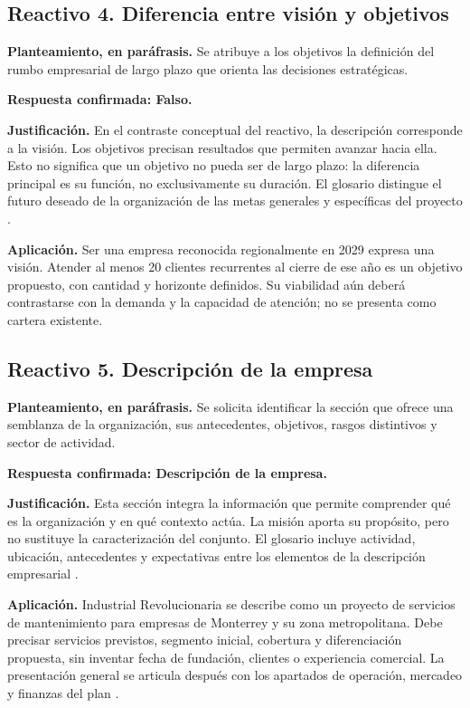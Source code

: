 {\subsection{Reactivo 4. Diferencia entre visión y objetivos}

\textbf{Planteamiento, en paráfrasis.} Se atribuye a los objetivos la definición del rumbo empresarial de largo plazo que orienta las decisiones estratégicas.

\textbf{Respuesta confirmada: Falso.}

\textbf{Justificación.} En el contraste conceptual del reactivo, la descripción corresponde a la visión. Los objetivos precisan resultados que permiten avanzar hacia ella. Esto no significa que un objetivo no pueda ser de largo plazo: la diferencia principal es su función, no exclusivamente su duración. El glosario distingue el futuro deseado de la organización de las metas generales y específicas del proyecto \citep{planNegociosGlosario2024}.

\textbf{Aplicación.} Ser una empresa reconocida regionalmente en 2029 expresa una visión. Atender al menos 20 clientes recurrentes al cierre de ese año es un objetivo propuesto, con cantidad y horizonte definidos. Su viabilidad aún deberá contrastarse con la demanda y la capacidad de atención; no se presenta como cartera existente.

\subsection{Reactivo 5. Descripción de la empresa}

\textbf{Planteamiento, en paráfrasis.} Se solicita identificar la sección que ofrece una semblanza de la organización, sus antecedentes, objetivos, rasgos distintivos y sector de actividad.

\textbf{Respuesta confirmada: Descripción de la empresa.}

\textbf{Justificación.} Esta sección integra la información que permite comprender qué es la organización y en qué contexto actúa. La misión aporta su propósito, pero no sustituye la caracterización del conjunto. El glosario incluye actividad, ubicación, antecedentes y expectativas entre los elementos de la descripción empresarial \citep{planNegociosGlosario2024}.

\textbf{Aplicación.} Industrial Revolucionaria se describe como un proyecto de servicios de mantenimiento para empresas de Monterrey y su zona metropolitana. Debe precisar servicios previstos, segmento inicial, cobertura y diferenciación propuesta, sin inventar fecha de fundación, clientes o experiencia comercial. La presentación general se articula después con los apartados de operación, mercadeo y finanzas del plan \citep{manualGuiaPlanNegocio}.

}
